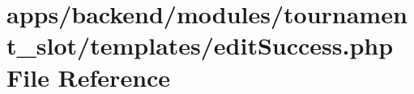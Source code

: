 \hypertarget{backend_2modules_2tournament__slot_2templates_2edit_success_8php}{\section{apps/backend/modules/tournament\-\_\-slot/templates/edit\-Success.php File Reference}
\label{backend_2modules_2tournament__slot_2templates_2edit_success_8php}
}
